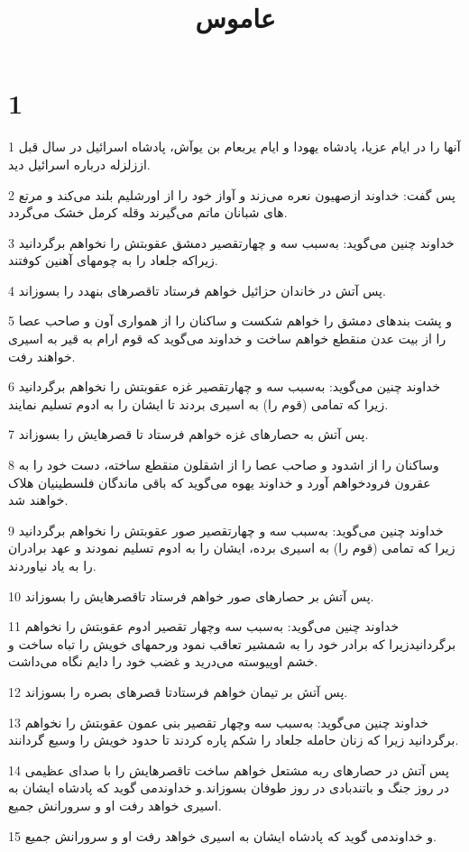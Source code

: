 

\title{عاموس}


\chapter{1}

\par 1 آنها را در ایام عزیا، پادشاه یهودا و ایام یربعام بن یوآش، پادشاه اسرائیل در سال قبل اززلزله درباره اسرائیل دید.
\par 2 پس گفت: خداوند ازصهیون نعره می‌زند و آواز خود را از اورشلیم بلند می‌کند و مرتع های شبانان ماتم می‌گیرند وقله کرمل خشک می‌گردد.
\par 3 خداوند چنین می‌گوید: به‌سبب سه و چهارتقصیر دمشق عقوبتش را نخواهم برگردانید زیراکه جلعاد را به چومهای آهنین کوفتند.
\par 4 پس آتش در خاندان حزائیل خواهم فرستاد تاقصرهای بنهدد را بسوزاند.
\par 5 و پشت بندهای دمشق را خواهم شکست و ساکنان را از همواری آون و صاحب عصا را از بیت عدن منقطع خواهم ساخت و خداوند می‌گوید که قوم ارام به قیر به اسیری خواهند رفت.
\par 6 خداوند چنین می‌گوید: به‌سبب سه و چهارتقصیر غزه عقوبتش را نخواهم برگردانید زیرا که تمامی (قوم را) به اسیری بردند تا ایشان را به ادوم تسلیم نمایند.
\par 7 پس آتش به حصارهای غزه خواهم فرستاد تا قصرهایش را بسوزاند.
\par 8 وساکنان را از اشدود و صاحب عصا را از اشقلون منقطع ساخته، دست خود را به عقرون فرودخواهم آورد و خداوند یهوه می‌گوید که باقی ماندگان فلسطینیان هلاک خواهند شد.
\par 9 خداوند چنین می‌گوید: به‌سبب سه و چهارتقصیر صور عقوبتش را نخواهم برگردانید زیرا که تمامی (قوم را) به اسیری برده، ایشان را به ادوم تسلیم نمودند و عهد برادران را به یاد نیاوردند.
\par 10 پس آتش بر حصارهای صور خواهم فرستاد تاقصرهایش را بسوزاند.
\par 11 خداوند چنین می‌گوید: به‌سبب سه وچهار تقصیر ادوم عقوبتش را نخواهم برگردانیدزیرا که برادر خود را به شمشیر تعاقب نمود ورحمهای خویش را تباه ساخت و خشم اوپیوسته می‌درید و غضب خود را دایم نگاه می‌داشت.
\par 12 پس آتش بر تیمان خواهم فرستادتا قصرهای بصره را بسوزاند.
\par 13 خداوند چنین می‌گوید: به‌سبب سه وچهار تقصیر بنی عمون عقوبتش را نخواهم برگردانید زیرا که زنان حامله جلعاد را شکم پاره کردند تا حدود خویش را وسیع گردانند.
\par 14 پس آتش در حصارهای ربه مشتعل خواهم ساخت تاقصرهایش را با صدای عظیمی در روز جنگ و باتندبادی در روز طوفان بسوزاند.و خداوندمی گوید که پادشاه ایشان به اسیری خواهد رفت او و سرورانش جمیع.
\par 15 و خداوندمی گوید که پادشاه ایشان به اسیری خواهد رفت او و سرورانش جمیع.

